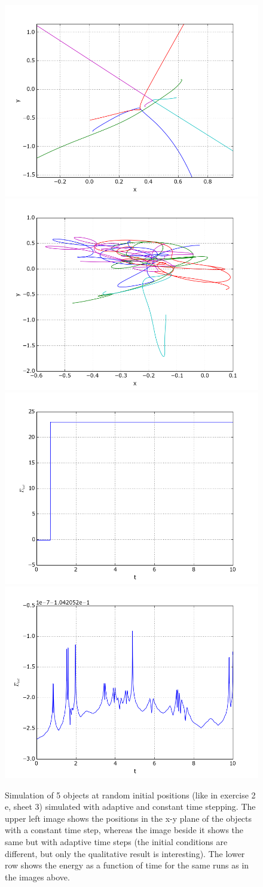 \documentclass[a4paper,10pt,openany]{article}
\begin{document}
\begin{figure}
\includegraphics[width=.5\textwidth]{5_bodies_constant_step.png}
\includegraphics[width=.5\textwidth]{5_bodies_adaptive_step.png}\\
\includegraphics[width=.5\textwidth]{5_bodies_constant_step_energy.png}
\includegraphics[width=.5\textwidth]{5_bodies_adaptive_step_energy.png}
\caption{Simulation of 5 objects at random initial positions (like in exercise 2 e, sheet 3) simulated with adaptive and constant time stepping. The upper left image shows the positions in the x-y plane of the objects with a constant time step, whereas the image beside it shows the same but with adaptive time steps (the initial conditions are different, but only the qualitative result is interesting). The lower row shows the energy as a function of time for the same runs as in the images above.}\label{fig:adaptive time stepping}
\end{figure}
\end{document}

